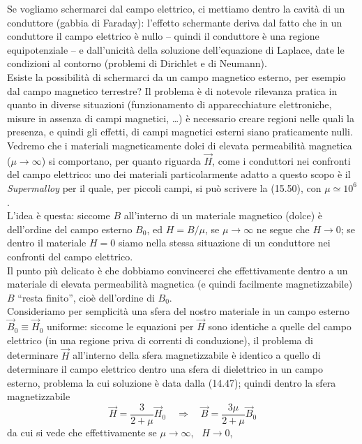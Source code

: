 Se vogliamo schermarci dal campo elettrico, ci mettiamo dentro la cavit\`a di un
conduttore (gabbia di Faraday): l'effetto schermante deriva dal fatto che in un
conduttore il campo elettrico \`e nullo -- quindi il conduttore \`e una regione
equipotenziale -- e dall'unicit\`a della soluzione dell'equazione di Laplace,
date le condizioni al contorno (problemi di Dirichlet e di Neumann).\\
Esiste la possibilit\`a di schermarci da un campo magnetico esterno, per esempio
dal campo magnetico terrestre? Il problema \`e di notevole rilevanza pratica in
quanto in diverse situazioni (funzionamento di apparecchiature elettroniche,
misure in assenza di campi magnetici, \dots) \`e necessario creare regioni nelle
quali la presenza, e quindi gli effetti, di campi magnetici esterni siano
praticamente nulli. Vedremo che i materiali magneticamente dolci di elevata
permeabilit\`a magnetica ($\mu\to\infty$) si comportano, per quanto riguarda
$\vec H$, come i conduttori nei confronti del campo elettrico: uno dei materiali
particolarmente adatto a questo scopo \`e il \textit{Supermalloy} per il quale,
per piccoli campi, si pu\`o scrivere la (15.50), con $\mu\simeq10^6$.\\
L'idea \`e questa: siccome $B$ all'interno di un materiale magnetico (dolce) \`e
dell'ordine del campo esterno $B_0$, ed $H=B/\mu$, se $\mu\to\infty$ ne segue
che $H\to0$; se dentro il materiale $H=0$ siamo nella stessa situazione di un
conduttore nei confronti del campo elettrico.\\
Il punto pi\`u delicato \`e che dobbiamo convincerci che effettivamente dentro a
un materiale di elevata permeabilit\`a magnetica (e quindi facilmente
magnetizzabile) $B$ ``resta finito'', cio\`e dell'ordine di $B_0$.\\
Consideriamo per semplicit\`a una sfera del nostro materiale in un campo esterno
$\vec B_0\equiv\vec H_0$ uniforme: siccome le equazioni per $\vec H$ sono
identiche a quelle del campo elettrico (in una regione priva di correnti di
conduzione), il problema di determinare $\vec H$ all'interno della sfera
magnetizzabile \`e identico a quello di determinare il campo elettrico dentro
una sfera di dielettrico in un campo esterno, problema la cui soluzione \`e data
dalla (14.47); quindi dentro la sfera magnetizzabile
\begin{equation}
  \vec H=\frac{3}{2+\mu}\vec H_0
  \quad\Rightarrow\quad\vec B=\frac{3\mu}{2+\mu}\vec B_0
  \tag{15.51}
\end{equation}
da cui si vede che effettivamente se $\mu\to\infty$, \ $H\to0$,
